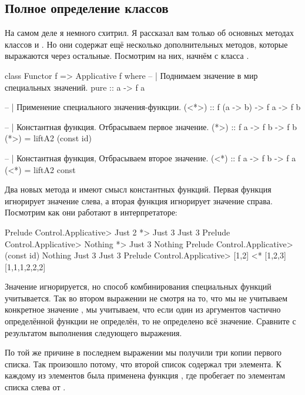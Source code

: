 \subsection{Полное определение классов}

На самом деле я немного схитрил. Я рассказал вам только
об основных методах классов  и .
Но они содержат ещё несколько дополнительных методов,
которые выражаются через остальные. Посмотрим на них, 
начнём с класса .

\begin{code}
class Functor f => Applicative f where
        -- | Поднимаем значение в мир специальных значений.
        pure :: a -> f a

        -- | Применение специального значения-функции.
        (<*>) :: f (a -> b) -> f a -> f b

        -- | Константная функция. Отбрасываем первое значение.
        (*>) :: f a -> f b -> f b
        (*>) = liftA2 (const id)
        
        -- | Константная функция, Отбрасываем второе значение.
        (<*) :: f a -> f b -> f a
        (<*) = liftA2 const
\end{code}

Два новых метода \In{(*>)} и \In{(<*)} имеют смысл
константных функций. Первая функция игнорирует значение слева,
а вторая функция игнорирует значение справа. 
Посмотрим как они работают в интерпретаторе:

\begin{code}
Prelude Control.Applicative> Just 2 *> Just 3
Just 3
Prelude Control.Applicative> Nothing *> Just 3
Nothing
Prelude Control.Applicative> (const id) Nothing  Just 3
Just 3
Prelude Control.Applicative> [1,2] <* [1,2,3]
[1,1,1,2,2,2]
\end{code}

Значение игнорируется, но способ комбинирования специальных
функций учитывается. Так во втором выражении не смотря на 
то, что мы не учитываем конкретное значение ,
мы учитываем, что если один из аргументов частично определённой
функции не определён, то не определено всё значение. 
Сравните с результатом выполнения следующего выражения. 

По той же причине в последнем выражении мы получили три
копии первого списка. Так произошло потому, что второй
список содержал три элемента. К каждому из элементов
была применена функция , где  пробегает
по элементам списка слева от \In{(<*)}.

